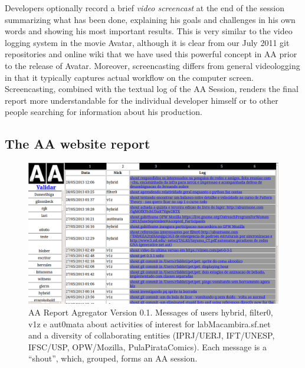 \documentclass{article}
\begin{document}
Developers optionally record a brief \emph{video screencast} at the end of the
session summarizing what has been done, explaining his goals and challenges
in his own words and showing his most important results. This is very similar to
the video logging system in the movie Avatar, although it is clear from our
July 2011 git repositories and online wiki that we have used this powerful
concept in AA prior to the release of Avatar. Moreover, screencasting differs
from general videologging in that it typically captures actual workflow on the
computer screen. Screencasting, combined with the textual log of the AA Session,
renders the final report more understandable for the individual developer
himself or to other people searching for information about his production.

\subsection{The AA website report}

\begin{figure}
\begin{center}
   \includegraphics[width=0.95\linewidth]{figs/aa-0_1_.png}
\end{center}
   \caption{AA Report Agregator Version 0.1. Messages of users hybrid, filter0,
   v1z e aut0mata about activities of interest for labMacambira.sf.net and
   a diversity of collaborating entities (IPRJ/UERJ, IFT/UNESP, IFSC/USP, OPW/Mozilla,
   PulaPirataComics). Each message is a ``shout'', which, grouped, forms an AA
   session.}
\label{fig:aaserver}
\end{figure}
\end{document}
